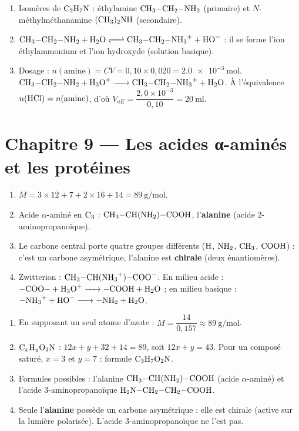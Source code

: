 \begin{enumerate}[label=\arabic*)]
\item Isomères de $\ce{C2H7N}$ : éthylamine $\ce{CH3-CH2-NH2}$ (primaire) et
$N$-méthylméthanamine $\ce{(CH3)2NH}$ (secondaire).
\item $\ce{CH3-CH2-NH2 + H2O <=> CH3-CH2-NH3+ + HO-}$ : il se forme l'ion
éthylammonium et l'ion hydroxyde (solution basique).
\item Dosage : $n(\text{amine}) = C V = 0{,}10\times0{,}020 = \SI{2.0e-3}{\mol}$.
$\ce{CH3-CH2-NH2 + H3O+ -> CH3-CH2-NH3+ + H2O}$. À l'équivalence
$n(\ce{HCl}) = n(\text{amine})$, d'où $V_{aE} = \dfrac{2{,}0\times10^{-3}}{0{,}10} = \SI{20}{\milli\litre}$.
\end{enumerate}

\section{Chapitre 9 — Les acides α-aminés et les protéines}

\begin{enumerate}[label=\arabic*)]
\item $M = 3\times12 + 7 + 2\times16 + 14 = \SI{89}{\gram\per\mol}$.
\item Acide $\alpha$-aminé en $\ce{C3}$ : $\ce{CH3-CH(NH2)-COOH}$, l'\textbf{alanine}
(acide 2-aminopropanoïque).
\item Le carbone central porte quatre groupes différents ($\ce{H}$, $\ce{NH2}$,
$\ce{CH3}$, $\ce{COOH}$) : c'est un carbone asymétrique, l'alanine est \textbf{chirale}
(deux énantiomères).
\item Zwitterion : $\ce{CH3-CH(NH3+)-COO-}$. En milieu acide :
$\ce{-COO- + H3O+ -> -COOH + H2O}$ ; en milieu basique :
$\ce{-NH3+ + HO- -> -NH2 + H2O}$.
\end{enumerate}

\begin{enumerate}[label=\arabic*)]
\item En supposant un seul atome d'azote : $M = \dfrac{14}{0{,}157} \approx \SI{89}{\gram\per\mol}$.
\item $\ce{C_xH_yO2N}$ : $12x + y + 32 + 14 = 89$, soit $12x + y = 43$. Pour un composé
saturé, $x = 3$ et $y = 7$ : formule $\ce{C3H7O2N}$.
\item Formules possibles : l'alanine $\ce{CH3-CH(NH2)-COOH}$ (acide $\alpha$-aminé) et
l'acide 3-aminopropanoïque $\ce{H2N-CH2-CH2-COOH}$.
\item Seule l'\textbf{alanine} possède un carbone asymétrique : elle est chirale (active
sur la lumière polarisée). L'acide 3-aminopropanoïque ne l'est pas.
\end{enumerate}


